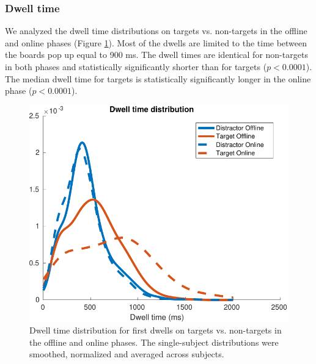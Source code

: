 \documentclass[12pt]{iopart}
\begin{document}
\subsubsection*{Dwell time}
We analyzed the dwell time distributions on targets vs. non-targets
in the offline and online phases (Figure \ref{fig:dwell}). 
Most of the dwells are limited to the time between the boards pop up equal to 900 ms.
The dwell times are identical for non-targets in both phases and statistically significantly
shorter than for targets ($p < 0.0001$).
The median dwell time for targets is statistically significantly longer in the online phase ($p < 0.0001$).

\begin{figure}[!t]
\center
    \includegraphics[trim={0cm 0cm 0cm 0cm},clip,width=0.6\columnwidth]{../images/DwelltimeDist_online_allmean.pdf}
    \caption{Dwell time distribution for first dwells on
    targets vs. non-targets in the offline and online phases. The single-subject
    distributions were smoothed, normalized and averaged across subjects.}
\label{fig:dwell}
\end{figure}
\end{document}
